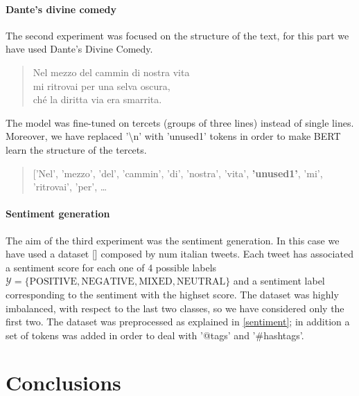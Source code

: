 \documentclass[10pt,twocolumn,letterpaper]{article}
\begin{document}
\paragraph{Dante's divine comedy} The second experiment was focused on the structure of the text, for this part we have used Dante's Divine Comedy.

\begin{quote}
   Nel mezzo del cammin di nostra vita\\
   mi ritrovai per una selva oscura,\\
   ché la diritta via era smarrita.\\

\end{quote}
The model was fine-tuned on tercets (groups of three lines) instead of single lines.
Moreover, we have replaced '\textbackslash n' with 'unused1' tokens in order to make BERT learn the structure of the tercets.

\begin{quote}
['Nel', 'mezzo', 'del', 'cammin', 'di', 'nostra', 'vita', \textbf{'unused1'},
 'mi',
 'ritrovai',
 'per', \ldots
\end{quote}

\paragraph{Sentiment generation} The aim of the third experiment was the sentiment generation.
In this case we have used a dataset [] composed by num italian tweets.
Each tweet has associated a sentiment score for each one of 4 possible labels
$\mathcal Y = \{\text{POSITIVE}, \text{NEGATIVE}, \text{MIXED}, \text{NEUTRAL}\}$ and a sentiment label corresponding
to the sentiment with the highset score. 
The dataset was highly imbalanced, with respect to the last two classes, so we have considered only the first two.
The dataset was preprocessed as explained in \ref{sentiment}; in addition a set of tokens was added in order to deal
with '@tags' and '#hashtags'.



\section{Conclusions}



\end{document}
